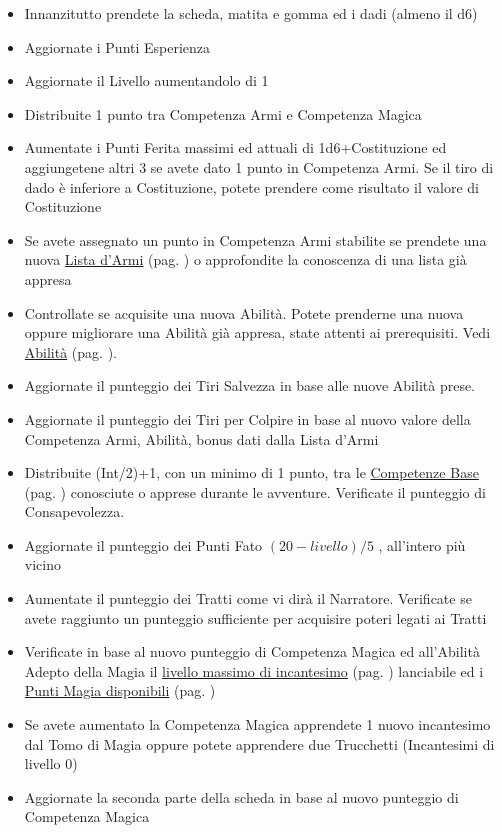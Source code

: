 \begin{multicols}{2}
\begin{itemize}[leftmargin=*] \setlength{\itemsep}{0pt}
\item Innanzitutto prendete la scheda, matita e gomma ed i dadi (almeno il d6)
\item Aggiornate i Punti Esperienza
\item Aggiornate il Livello aumentandolo di 1
\item Distribuite 1 punto tra Competenza Armi e Competenza Magica
\item Aumentate i Punti Ferita massimi ed attuali di 1d6+Costituzione ed aggiungetene altri 3 se avete dato 1 punto in Competenza Armi. Se il tiro di dado è inferiore a Costituzione, potete prendere come risultato il valore di Costituzione
\item Se avete assegnato un punto in Competenza Armi stabilite se prendete una nuova \hyperlink{lista.armi}{Lista d'Armi} (pag. \pageref{lista.armi}) o approfondite la conoscenza di una lista già appresa
\item Controllate se acquisite una nuova Abilità. Potete prenderne una nuova oppure migliorare una Abilità già appresa, state attenti ai prerequisiti. Vedi \hyperlink{abilita}{Abilità} (pag. \pageref{abilita}).
\item Aggiornate il punteggio dei Tiri Salvezza in base alle nuove Abilità prese.
\item Aggiornate il punteggio dei Tiri per Colpire in base al nuovo valore della Competenza Armi, Abilità, bonus dati dalla Lista d'Armi
\item Distribuite (Int/2)+1, con un minimo di 1 punto, tra le \hyperlink{competenzeelenco}{Competenze Base} (pag. \pageref{competenzeelenco}) conosciute o apprese durante le avventure. Verificate il punteggio di Consapevolezza.
\item Aggiornate il punteggio dei Punti Fato $(20-livello)/5$ , all'intero più vicino
\item Aumentate il punteggio dei Tratti come vi dirà il Narratore. Verificate se avete raggiunto un punteggio sufficiente per acquisire poteri legati ai Tratti
\item Verificate in base al nuovo punteggio di Competenza Magica ed all'Abilità Adepto della Magia il \hyperlink{scuoleelivelli}{livello massimo di incantesimo} (pag. \pageref{scuoleelivelli}) lanciabile ed i \hyperlink{magiepuntimagia}{Punti Magia disponibili} (pag. \pageref{magiepuntimagia})
\item Se avete aumentato la Competenza Magica apprendete 1 nuovo incantesimo dal Tomo di Magia oppure potete apprendere due Trucchetti (Incantesimi di livello 0)
\item Aggiornate la seconda parte della scheda in base al nuovo punteggio di Competenza Magica
\end{itemize}


\end{multicols}
